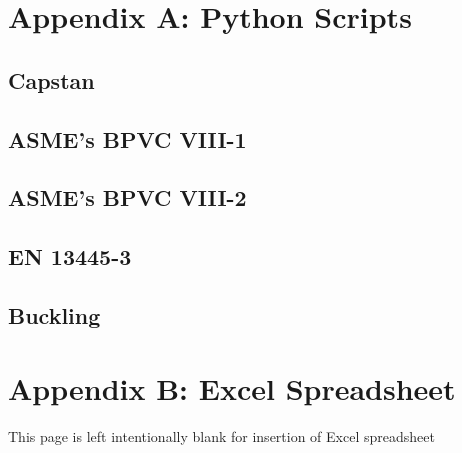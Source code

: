 \renewcommand{\thesection}{A.\arabic{section}}
\chapter{Appendix A: Python Scripts}
\label{appendix:a}
\nopagebreak
\begin{small}
	
	\section{Capstan}
	\label{appendix:a0}
	
	\pagebreak	
	
	\section{ASME's BPVC VIII-1}
	\label{appendix:a1}
	
	\pagebreak
	
	\section{ASME's BPVC VIII-2}
	\label{appendix:a2}
	
	\pagebreak
	
	\section{EN 13445-3}
	\label{appendix:a3}
	
	
	\section{Buckling}
	\label{appendix:a4}
	

\end{small}

\renewcommand{\thesection}{B.\arabic{section}}
\chapter{Appendix B: Excel Spreadsheet}
\label{appendix:b}

\vfill
\begin{center}
This page is left intentionally blank for insertion of Excel spreadsheet
\end{center}
\vfill


